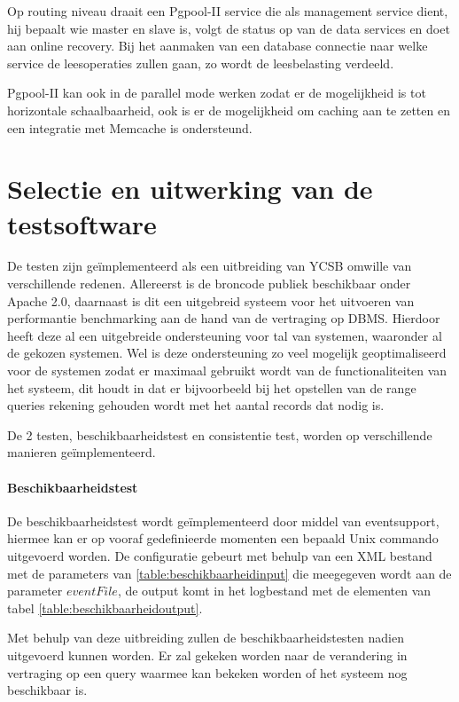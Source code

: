 Op routing niveau draait een Pgpool-II service die als management service dient, hij bepaalt wie master en slave is, volgt de status op van de data services en doet aan online recovery. Bij het aanmaken van een database connectie naar welke service de leesoperaties zullen gaan, zo wordt de leesbelasting verdeeld. 

Pgpool-II kan ook in de parallel mode werken zodat er de mogelijkheid is tot horizontale schaalbaarheid, ook is er de mogelijkheid om caching aan te zetten en een integratie met Memcache is ondersteund. 

\section{Selectie en uitwerking van de testsoftware}
De testen zijn geïmplementeerd als een uitbreiding van YCSB\cite{cooper2010benchmarking} omwille van verschillende redenen. Allereerst is de broncode publiek beschikbaar onder Apache 2.0, daarnaast is dit een uitgebreid systeem voor het uitvoeren van performantie benchmarking aan de hand van de vertraging op \gls{DBMS}. Hierdoor heeft deze al een uitgebreide ondersteuning voor tal van systemen, waaronder al de gekozen systemen. Wel is deze ondersteuning zo veel mogelijk geoptimaliseerd voor de systemen zodat er maximaal gebruikt wordt van de functionaliteiten van het systeem, dit houdt in dat er bijvoorbeeld bij het opstellen van de range queries rekening gehouden wordt met het aantal records dat nodig is. 

De 2 testen, beschikbaarheidstest en consistentie test, worden op verschillende manieren geïmplementeerd. 

\paragraph{Beschikbaarheidstest} De beschikbaarheidstest wordt geïmplementeerd door middel van \gls{eventsupport}, hiermee kan er op vooraf gedefinieerde momenten een bepaald Unix commando uitgevoerd worden. De configuratie gebeurt met behulp van een XML bestand met de parameters van \ref{table:beschikbaarheidinput} die meegegeven wordt aan de parameter $eventFile$, de output komt in het logbestand met de elementen van tabel \ref{table:beschikbaarheidoutput}. 

Met behulp van deze uitbreiding zullen de beschikbaarheidstesten nadien uitgevoerd kunnen worden. Er zal gekeken worden naar de verandering in vertraging op een query waarmee kan bekeken worden of het systeem nog beschikbaar is. 


